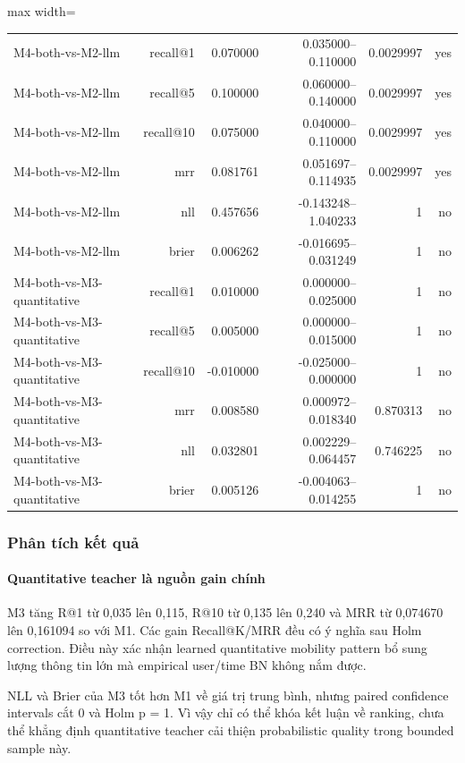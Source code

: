 \begin{table}[!htbp]
\begin{adjustbox}{max width=\textwidth}
\begin{tabular}{@{}lrrrrr@{}}
M4-both-vs-M2-llm & recall@1 & 0.070000 & 0.035000--0.110000 & 0.0029997 & yes \\
M4-both-vs-M2-llm & recall@5 & 0.100000 & 0.060000--0.140000 & 0.0029997 & yes \\
M4-both-vs-M2-llm & recall@10 & 0.075000 & 0.040000--0.110000 & 0.0029997 & yes \\
M4-both-vs-M2-llm & mrr & 0.081761 & 0.051697--0.114935 & 0.0029997 & yes \\
M4-both-vs-M2-llm & nll & 0.457656 & -0.143248--1.040233 & 1 & no \\
M4-both-vs-M2-llm & brier & 0.006262 & -0.016695--0.031249 & 1 & no \\
M4-both-vs-M3-quantitative & recall@1 & 0.010000 & 0.000000--0.025000 & 1 & no \\
M4-both-vs-M3-quantitative & recall@5 & 0.005000 & 0.000000--0.015000 & 1 & no \\
M4-both-vs-M3-quantitative & recall@10 & -0.010000 & -0.025000--0.000000 & 1 & no \\
M4-both-vs-M3-quantitative & mrr & 0.008580 & 0.000972--0.018340 & 0.870313 & no \\
M4-both-vs-M3-quantitative & nll & 0.032801 & 0.002229--0.064457 & 0.746225 & no \\
M4-both-vs-M3-quantitative & brier & 0.005126 & -0.004063--0.014255 & 1 & no \\
\bottomrule
\end{tabular}
\end{adjustbox}
\end{table}

\subsubsection*{Phân tích kết quả}

\paragraph{Quantitative teacher là nguồn gain chính}

M3 tăng R@1 từ 0,035 lên 0,115, R@10 từ 0,135 lên 0,240 và MRR từ 0,074670 lên 0,161094 so với M1. Các gain Recall@K/MRR đều có ý nghĩa sau Holm correction. Điều này xác nhận learned quantitative mobility pattern bổ sung lượng thông tin lớn mà empirical user/time BN không nắm được.

NLL và Brier của M3 tốt hơn M1 về giá trị trung bình, nhưng paired confidence intervals cắt 0 và Holm p = 1. Vì vậy chỉ có thể khóa kết luận về ranking, chưa thể khẳng định quantitative teacher cải thiện probabilistic quality trong bounded sample này.


